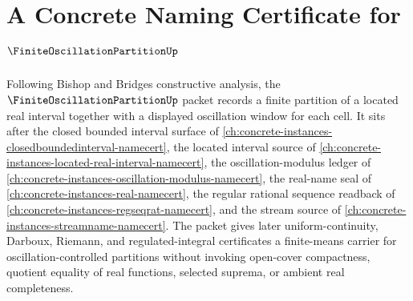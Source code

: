 \chapter{A Concrete Naming Certificate for $\FiniteOscillationPartitionUp$}
\label{ch:concrete-instances-finite-oscillation-partition-namecert}

Following Bishop and Bridges constructive analysis, the $\FiniteOscillationPartitionUp$ packet records a finite partition of a located real interval together with a displayed oscillation window for each cell. It sits after the closed bounded interval surface of \autoref{ch:concrete-instances-closedboundedinterval-namecert}, the located interval source of \autoref{ch:concrete-instances-located-real-interval-namecert}, the oscillation-modulus ledger of \autoref{ch:concrete-instances-oscillation-modulus-namecert}, the real-name seal of \autoref{ch:concrete-instances-real-namecert}, the regular rational sequence readback of \autoref{ch:concrete-instances-regseqrat-namecert}, and the stream source of \autoref{ch:concrete-instances-streamname-namecert}. The packet gives later uniform-continuity, Darboux, Riemann, and regulated-integral certificates a finite-means carrier for oscillation-controlled partitions without invoking open-cover compactness, quotient equality of real functions, selected suprema, or ambient real completeness.

